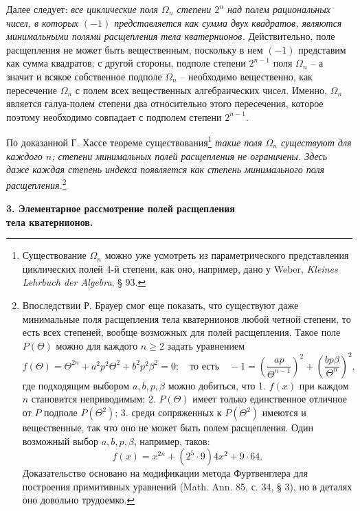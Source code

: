\documentclass[11pt]{article}
\begin{document}
\noindent Далее следует: \emph{все циклические поля $\Omega_n$ степени $2^n$ над полем рациональных чисел, в которых $(-1)$ представляется как сумма двух квадратов, являются минимальными полями расщепления тела кватернионов.} Действительно, поле расщепления не может быть вещественным, поскольку в нем $(-1)$ представим как сумма квадратов; с другой стороны, подполе степени $2^{n-1}$ поля $\Omega_n$ -- а значит и всякое собственное подполе $\Omega_n$ -- необходимо вещественно, как пересечение $\Omega_n$ с полем всех вещественных алгебраических чисел. Именно, $\Omega_n$ является галуа-полем степени два относительно этого пересечения, которое поэтому необходимо совпадает с подполем степени $2^{n-1}$.

\medskip

\noindent По доказанной Г. Хассе теореме существования\footnote{Существование $\Omega_n$ можно уже усмотреть из параметрического представления циклических полей 4-й степени, как оно, например, дано у Weber, \emph{Kleines Lehrbuch der Algebra}, § 93.} \emph{такие поля $\Omega_n$ существуют для каждого $n$; степени минимальных полей расщепления не ограничены. Здесь даже каждая степень индекса появляется как степень минимального поля расщепления.}\footnote{Впоследствии Р. Брауер смог еще показать, что существуют даже минимальные поля расщепления тела кватернионов любой четной степени, то есть всех степеней, вообще возможных для полей расщепления. Такое поле $P(\Theta)$ можно для каждого $n\ge2$ задать уравнением
\[
 f(\Theta)=\Theta^{2n}+a^2p^2\Theta^2+b^2p^2\beta^2=0;
 \quad \text{то есть}\quad -1=\left(\frac{ap}{\Theta^{n-1}}\right)^2+
       \left(\frac{bp\beta}{\Theta^n}\right)^2,
\]
где подходящим выбором $a,b,p,\beta$ можно добиться, что 1. $f(x)$ при каждом $n$ становится неприводимым; 2. $P(\Theta)$ имеет только единственное отличное от $P$ подполе $P(\Theta^2)$; 3. среди сопряженных к $P(\Theta^2)$ имеются и вещественные, так что оно не может быть полем расщепления. Один возможный выбор $a,b,p,\beta$, например, таков:
\[
        f(x)=x^{2n}+(2^5\cdot9)4x^2+9\cdot64.
\]
Доказательство основано на модификации метода Фуртвенглера для построения примитивных уравнений (Math. Ann. 85, с. 34, § 3), но в деталях оно довольно трудоемко.}

\begin{center}
\textbf{3. Элементарное рассмотрение полей расщепления\\
тела кватернионов.}
\end{center}
\end{document}

